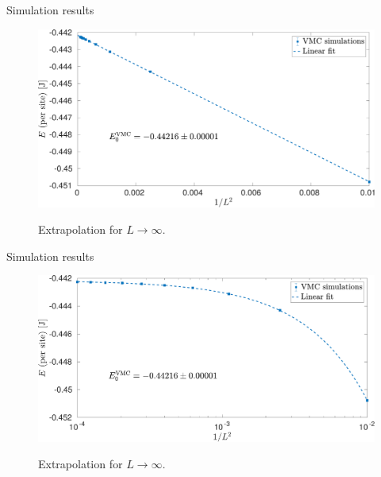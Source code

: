 \documentclass[10pt, compress, protectframetitle, handout]{beamer}
\begin{document}
\begin{frame}{Simulation results}

	\begin{figure}
		\centering
		\includegraphics[width=\textwidth]{E_VMC}
		\label{fig:E_VMC}
		\caption{Extrapolation for $L \to \infty$.}
	\end{figure}
	
\end{frame}

\begin{frame}{Simulation results}

	\begin{figure}
		\centering
		\includegraphics[width=\textwidth]{E_VMC_log}
		\label{fig:E_VMC_log}
		\caption{Extrapolation for $L \to \infty$.}
	\end{figure}
	
\end{frame}

%
%	
\end{document}
